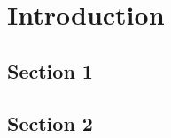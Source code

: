 \chapter{Introduction}
	\lipsum[1-10]
\section{Section 1}
	\lipsum[1-5]
\section{Section 2}
	\lipsum[1-5]